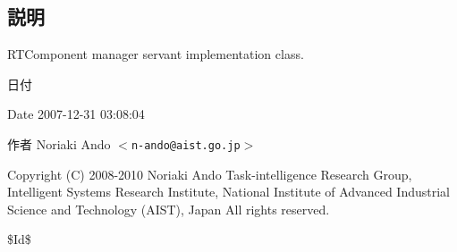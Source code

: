 \subsection{説明}
RTComponent manager servant implementation class. \begin{DoxyDate}{日付}

\end{DoxyDate}
\begin{DoxyParagraph}{Date}
2007-\/12-\/31 03:08:04 
\end{DoxyParagraph}
\begin{DoxyAuthor}{作者}
Noriaki Ando $<${\tt n-\/ando@aist.go.jp}$>$
\end{DoxyAuthor}
Copyright (C) 2008-\/2010 Noriaki Ando Task-\/intelligence Research Group, Intelligent Systems Research Institute, National Institute of Advanced Industrial Science and Technology (AIST), Japan All rights reserved.

\$Id\$ 